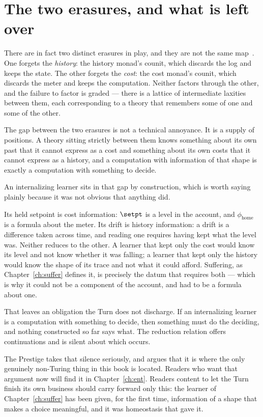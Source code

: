 \section{The two erasures, and what is left over}

\begin{remark}
\label{rmk:two-erasures}
There are in fact two distinct erasures in play, and they are not the
same map~\cite{TwoErasures}.
One forgets the \emph{history}: the history monad's counit, which
discards the log and keeps the state.
The other forgets the \emph{cost}: the cost monad's counit, which
discards the meter and keeps the computation.
Neither factors through the other, and the failure to factor is graded
--- there is a lattice of intermediate laxities between them, each
corresponding to a theory that remembers some of one and some of the
other.

The gap between the two erasures is not a technical annoyance.
It is a supply of positions.
A theory sitting strictly between them knows something about its own past
that it cannot express as a cost and something about its own costs that
it cannot express as a history, and a computation with information of
that shape is exactly a computation with something to decide.
\end{remark}

An internalizing learner sits in that gap by construction, which is worth
saying plainly because it was not obvious that anything did.

Its held setpoint is cost information: $\setpt$ is a level in the
account, and $\phi_{\mathrm{home}}$ is a formula about the meter.
Its drift is history information: a drift is a difference taken across
time, and reading one requires having kept what the level was.
Neither reduces to the other.
A learner that kept only the cost would know its level and not know
whether it was falling; a learner that kept only the history would know
the shape of its trace and not what it could afford.
Suffering, as Chapter~\ref{ch:suffer} defines it, is precisely the datum
that requires both --- which is why it could not be a component of the
account, and had to be a formula about one.

\begin{remark}
\label{ent:rmk:handoff}
That leaves an obligation the Turn does not discharge.
If an internalizing learner is a computation with something to decide,
then something must do the deciding, and nothing constructed so far says
what.
The reduction relation offers continuations and is silent about which
occurs.

The Prestige takes that silence seriously, and argues that it is where
the only genuinely non-Turing thing in this book is located.
Readers who want that argument now will find it in
Chapter~\ref{ch:ent}.
Readers content to let the Turn finish its own business should carry
forward only this: the learner of Chapter~\ref{ch:suffer} has been given,
for the first time, information of a shape that makes a choice
meaningful, and it was homeostasis that gave it.
\end{remark}

